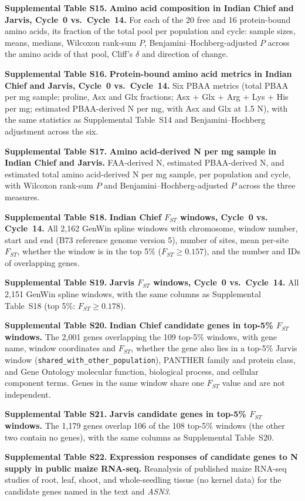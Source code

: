 \documentclass[11pt]{article}
\begin{document}
\noindent\textbf{Supplemental Table S15.} \textbf{Amino acid composition in Indian Chief and Jarvis, Cycle~0 vs.\ Cycle~14.} For each of the 20 free and 16 protein-bound amino acids, its fraction of the total pool per population and cycle: sample sizes, means, medians, Wilcoxon rank-sum $P$, Benjamini--Hochberg-adjusted $P$ across the amino acids of that pool, Cliff's $\delta$ and direction of change.

\noindent\textbf{Supplemental Table S16.} \textbf{Protein-bound amino acid metrics in Indian Chief and Jarvis, Cycle~0 vs.\ Cycle~14.} Six PBAA metrics (total PBAA per mg sample; proline, Asx and Glx fractions; Asx + Glx + Arg + Lys + His per mg; estimated PBAA-derived N per mg, with Asx and Glx at 1.5 N), with the same statistics as Supplemental Table~S14 and Benjamini--Hochberg adjustment across the six.

\noindent\textbf{Supplemental Table S17.} \textbf{Amino acid-derived N per mg sample in Indian Chief and Jarvis.} FAA-derived N, estimated PBAA-derived N, and estimated total amino acid-derived N per mg sample, per population and cycle, with Wilcoxon rank-sum $P$ and Benjamini--Hochberg-adjusted $P$ across the three measures.

\noindent\textbf{Supplemental Table S18.} \textbf{Indian Chief $F_{ST}$ windows, Cycle~0 vs. Cycle~14.} All 2,162 GenWin spline windows with chromosome, window number, start and end (B73 reference genome version 5), number of sites, mean per-site $F_{ST}$, whether the window is in the top 5\% ($F_{ST} \geq 0.157$), and the number and IDs of overlapping genes.

\noindent\textbf{Supplemental Table S19.} \textbf{Jarvis $F_{ST}$ windows, Cycle~0 vs.\ Cycle~14.} All 2,151 GenWin spline windows, with the same columns as Supplemental Table~S18 (top 5\%: $F_{ST} \geq 0.178$).

\noindent\textbf{Supplemental Table S20.} \textbf{Indian Chief candidate genes in top-5\% $F_{ST}$ windows.} The 2,001 genes overlapping the 109 top-5\% windows, with gene name, window coordinates and $F_{ST}$, whether the gene also lies in a top-5\% Jarvis window (\texttt{shared\_with\_other\_population}), PANTHER family and protein class, and Gene Ontology molecular function, biological process, and cellular component terms. Genes in the same window share one $F_{ST}$ value and are not independent.

\noindent\textbf{Supplemental Table S21.} \textbf{Jarvis candidate genes in top-5\% $F_{ST}$ windows.} The 1,179 genes overlap 106 of the 108 top-5\% windows (the other two contain no genes), with the same columns as Supplemental Table~S20.

\noindent\textbf{Supplemental Table S22.} \textbf{Expression responses of candidate genes to N supply in public maize RNA-seq.} Reanalysis of published maize RNA-seq studies of root, leaf, shoot, and whole-seedling tissue (no kernel data) for the candidate genes named in the text and \textit{ASN3}.




\end{document}
